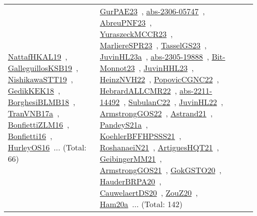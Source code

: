 {\begin{longtable}{lp{3cm}>{\raggedright\arraybackslash}p{6cm}>{\raggedright\arraybackslash}p{6cm}>{\raggedright\arraybackslash}p{8cm}}
\href{../works/NattafHKAL19.pdf}{NattafHKAL19}~\cite{NattafHKAL19}, \href{../works/GalleguillosKSB19.pdf}{GalleguillosKSB19}~\cite{GalleguillosKSB19}, \href{../works/NishikawaSTT19.pdf}{NishikawaSTT19}~\cite{NishikawaSTT19}, \href{../works/GedikKEK18.pdf}{GedikKEK18}~\cite{GedikKEK18}, \href{../works/BorghesiBLMB18.pdf}{BorghesiBLMB18}~\cite{BorghesiBLMB18}, \href{../works/TranVNB17a.pdf}{TranVNB17a}~\cite{TranVNB17a}, \href{../works/BonfiettiZLM16.pdf}{BonfiettiZLM16}~\cite{BonfiettiZLM16}, \href{../works/Bonfietti16.pdf}{Bonfietti16}~\cite{Bonfietti16}, \href{../works/HurleyOS16.pdf}{HurleyOS16}~\cite{HurleyOS16}... (Total: 66) & \href{../works/GurPAE23.pdf}{GurPAE23}~\cite{GurPAE23}, \href{../works/abs-2306-05747.pdf}{abs-2306-05747}~\cite{abs-2306-05747}, \href{../works/AbreuPNF23.pdf}{AbreuPNF23}~\cite{AbreuPNF23}, \href{../works/YuraszeckMCCR23.pdf}{YuraszeckMCCR23}~\cite{YuraszeckMCCR23}, \href{../works/MarliereSPR23.pdf}{MarliereSPR23}~\cite{MarliereSPR23}, \href{../works/TasselGS23.pdf}{TasselGS23}~\cite{TasselGS23}, \href{../works/JuvinHL23a.pdf}{JuvinHL23a}~\cite{JuvinHL23a}, \href{../works/abs-2305-19888.pdf}{abs-2305-19888}~\cite{abs-2305-19888}, \href{../works/Bit-Monnot23.pdf}{Bit-Monnot23}~\cite{Bit-Monnot23}, \href{../works/JuvinHHL23.pdf}{JuvinHHL23}~\cite{JuvinHHL23}, \href{../works/HeinzNVH22.pdf}{HeinzNVH22}~\cite{HeinzNVH22}, \href{../works/PopovicCGNC22.pdf}{PopovicCGNC22}~\cite{PopovicCGNC22}, \href{../works/HebrardALLCMR22.pdf}{HebrardALLCMR22}~\cite{HebrardALLCMR22}, \href{../works/abs-2211-14492.pdf}{abs-2211-14492}~\cite{abs-2211-14492}, \href{../works/SubulanC22.pdf}{SubulanC22}~\cite{SubulanC22}, \href{../works/JuvinHL22.pdf}{JuvinHL22}~\cite{JuvinHL22}, \href{../works/ArmstrongGOS22.pdf}{ArmstrongGOS22}~\cite{ArmstrongGOS22}, \href{../works/Astrand21.pdf}{Astrand21}~\cite{Astrand21}, \href{../works/PandeyS21a.pdf}{PandeyS21a}~\cite{PandeyS21a}, \href{../works/KoehlerBFFHPSSS21.pdf}{KoehlerBFFHPSSS21}~\cite{KoehlerBFFHPSSS21}, \href{../works/RoshanaeiN21.pdf}{RoshanaeiN21}~\cite{RoshanaeiN21}, \href{../works/ArtiguesHQT21.pdf}{ArtiguesHQT21}~\cite{ArtiguesHQT21}, \href{../works/GeibingerMM21.pdf}{GeibingerMM21}~\cite{GeibingerMM21}, \href{../works/ArmstrongGOS21.pdf}{ArmstrongGOS21}~\cite{ArmstrongGOS21}, \href{../works/GokGSTO20.pdf}{GokGSTO20}~\cite{GokGSTO20}, \href{../works/HauderBRPA20.pdf}{HauderBRPA20}~\cite{HauderBRPA20}, \href{../works/CauwelaertDS20.pdf}{CauwelaertDS20}~\cite{CauwelaertDS20}, \href{../works/ZouZ20.pdf}{ZouZ20}~\cite{ZouZ20}, \href{../works/Ham20a.pdf}{Ham20a}~\cite{Ham20a}... (Total: 142)\\

\end{longtable}}
